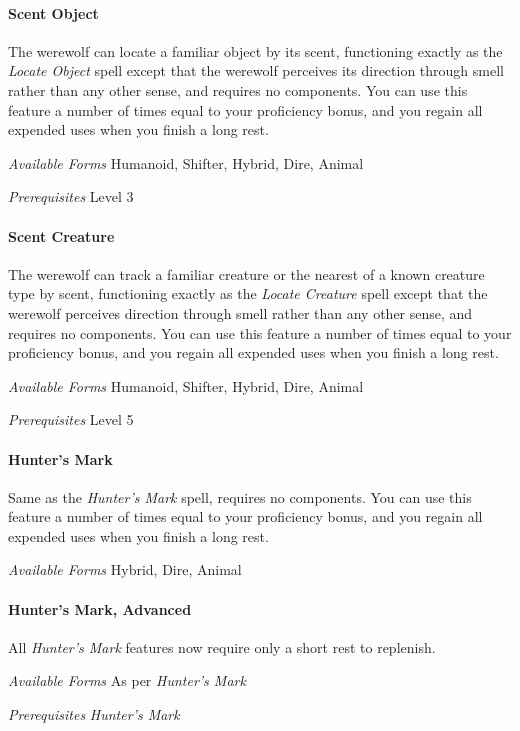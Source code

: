 \documentclass[twocolumn]{dndbook}
\begin{document}
\paragraph*{Scent Object}
The werewolf can locate a familiar object by its scent, functioning exactly as the \emph{Locate Object} spell except that the werewolf perceives its direction through smell rather than any other sense, and requires no components.
You can use this feature a number of times equal to your proficiency bonus, and you regain all expended uses when you finish a long rest.\par
\emph{Available Forms} Humanoid, Shifter, Hybrid, Dire, Animal\par
\emph{Prerequisites} Level 3\par

\paragraph*{Scent Creature}
The werewolf can track a familiar creature or the nearest of a known creature type by scent, functioning exactly as the \emph{Locate Creature} spell except that the werewolf perceives direction through smell rather than any other sense, and requires no components.
You can use this feature a number of times equal to your proficiency bonus, and you regain all expended uses when you finish a long rest.\par
\emph{Available Forms} Humanoid, Shifter, Hybrid, Dire, Animal\par
\emph{Prerequisites} Level 5\par

\paragraph*{Hunter's Mark}
Same as the \emph{Hunter's Mark} spell, requires no components.
You can use this feature a number of times equal to your proficiency bonus, and you regain all expended uses when you finish a long rest.\par
\emph{Available Forms} Hybrid, Dire, Animal\par

\paragraph*{Hunter's Mark, Advanced}
All \emph{Hunter's Mark} features now require only a short rest to replenish.\par
\emph{Available Forms} As per \emph{Hunter's Mark}\par
\emph{Prerequisites} \emph{Hunter's Mark}\par
\end{document}
